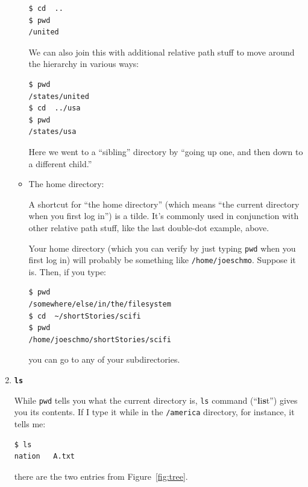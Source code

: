 \begin{enumerate}
\begin{itemize}
\begin{Verbatim}[fontsize=\small]
$ cd  ..
$ pwd
/united
\end{Verbatim}

We can also join this with additional relative path stuff to move around the
hierarchy in various ways:

\begin{Verbatim}[fontsize=\small]
$ pwd
/states/united
$ cd  ../usa
$ pwd
/states/usa
\end{Verbatim}

Here we went to a ``sibling'' directory by ``going up one, and then down to a
different child.''

\item The home directory: \texttt{\textbf{\freakingtilde}}

A shortcut for ``the home directory'' (which means ``the current directory when
you first log in'') is a tilde. It's commonly used in conjunction with other
relative path stuff, like the last double-dot example, above.

Your home directory (which you can verify by just typing \texttt{pwd} when
you first log in) will probably be something like \texttt{/home/joeschmo}.
Suppose it is. Then, if you type:

\begin{Verbatim}[fontsize=\small]
$ pwd
/somewhere/else/in/the/filesystem
$ cd  ~/shortStories/scifi
$ pwd
/home/joeschmo/shortStories/scifi
\end{Verbatim}

you can go to any of your subdirectories.

\end{itemize}

\bigline
\item \textbf{\texttt{ls}}

While \texttt{pwd} tells you what the current directory is, \texttt{ls}
command (``\textbf{l}i\textbf{s}t'') gives you its contents. If I type it while
in the \texttt{/america} directory, for instance, it tells me:

\begin{Verbatim}[fontsize=\small]
$ ls
nation   A.txt
\end{Verbatim}

there are the two entries from Figure~\ref{fig:tree}.


\end{enumerate}
